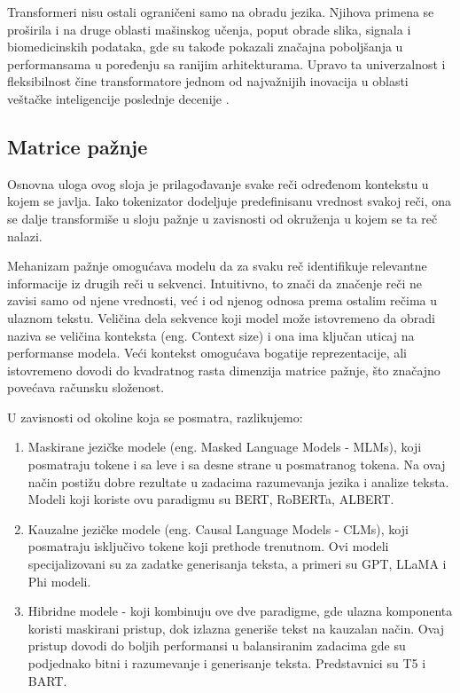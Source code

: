 \documentclass[12pt,oneside]{memoir}
\begin{document}
Transformeri nisu ostali ograničeni samo na obradu jezika. Njihova primena se proširila i na druge oblasti mašinskog učenja, poput obrade slika, signala i biomedicinskih podataka, gde su takođe pokazali značajna poboljšanja u performansama u poređenju sa ranijim arhitekturama. Upravo ta univerzalnost i fleksibilnost čine transformatore jednom od najvažnijih inovacija u oblasti veštačke inteligencije poslednje decenije \cite{TransformersForImageRecognition}.

\subsection {Matrice pažnje}

Osnovna uloga ovog sloja je prilagođavanje svake reči određenom kontekstu u kojem se javlja. Iako tokenizator dodeljuje predefinisanu vrednost svakoj reči, ona se dalje transformiše u sloju pažnje u zavisnosti od okruženja u kojem se ta reč nalazi.

Mehanizam pažnje omogućava modelu da za svaku reč identifikuje relevantne informacije iz drugih reči u sekvenci. Intuitivno, to znači da značenje reči ne zavisi samo od njene vrednosti, već i od njenog odnosa prema ostalim rečima u ulaznom tekstu. Veličina dela sekvence koji model može istovremeno da obradi naziva se veličina konteksta (eng. Context size) i ona ima ključan uticaj na performanse modela. Veći kontekst omogućava bogatije reprezentacije, ali istovremeno dovodi do kvadratnog rasta dimenzija matrice pažnje, što značajno povećava računsku složenost.

U zavisnosti od okoline koja se posmatra, razlikujemo:
\begin{enumerate}
	\item Maskirane jezičke modele (eng. Masked Language Models - MLMs), koji posmatraju tokene i sa leve i sa desne strane u posmatranog tokena. Na ovaj način postižu dobre rezultate u zadacima razumevanja jezika i analize teksta. Modeli koji koriste ovu paradigmu su BERT, RoBERTa, ALBERT.
\item Kauzalne jezičke modele (eng. Causal Language Models - CLMs), koji posmatraju isključivo tokene koji prethode trenutnom. Ovi modeli specijalizovani su za zadatke generisanja teksta, a primeri su GPT, LLaMA i Phi modeli.
\item Hibridne modele - koji kombinuju ove dve paradigme, gde ulazna komponenta koristi maskirani pristup, dok izlazna generiše tekst na kauzalan način. Ovaj pristup dovodi do boljih performansi u balansiranim zadacima gde su podjednako bitni i razumevanje i generisanje teksta. Predstavnici su T5 i BART.
\end{enumerate}
\end{document}
